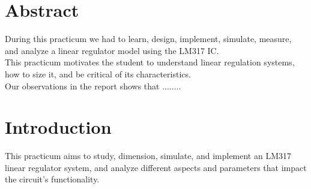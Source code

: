\documentclass[12pt]{article}
\begin{document}
\pagestyle{fancy}
\chead {\today}
\fontsize{16}{16}\selectfont


\clearpage

\section*{Abstract}
{
During this practicum we had to learn, design, implement, simulate, measure, and analyze a linear regulator model using the LM317 IC.\\ 
This practicum motivates the student to understand linear regulation systems, how to size it, and be critical of its characteristics.\\
Our observations in the report shows that  ........
}
\clearpage

\tableofcontents
\clearpage

\section{Introduction}
This practicum aims to study, dimension, simulate, and implement an LM317 linear regulator system, and analyze different aspects and parameters that impact the circuit's functionality.
\clearpage





\end{document}
